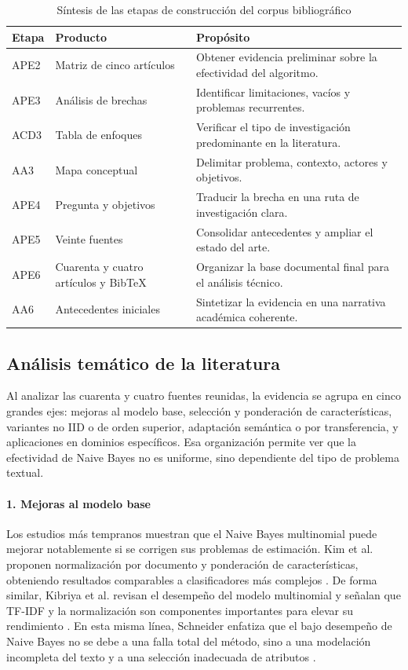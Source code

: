 \begin{table}[htbp]
\centering
\caption{Síntesis de las etapas de construcción del corpus bibliográfico}
\label{tab:etapas}
\begin{tabular}{|p{2.4cm}|p{2.8cm}|p{8.0cm}|}
\hline
\textbf{Etapa} & \textbf{Producto} & \textbf{Propósito} \\
\hline
APE2 & Matriz de cinco artículos & Obtener evidencia preliminar sobre la efectividad del algoritmo. \\
\hline
APE3 & Análisis de brechas & Identificar limitaciones, vacíos y problemas recurrentes. \\
\hline
ACD3 & Tabla de enfoques & Verificar el tipo de investigación predominante en la literatura. \\
\hline
AA3 & Mapa conceptual & Delimitar problema, contexto, actores y objetivos. \\
\hline
APE4 & Pregunta y objetivos & Traducir la brecha en una ruta de investigación clara. \\
\hline
APE5 & Veinte fuentes & Consolidar antecedentes y ampliar el estado del arte. \\
\hline
APE6 & Cuarenta y cuatro artículos y BibTeX & Organizar la base documental final para el análisis técnico. \\
\hline
AA6 & Antecedentes iniciales & Sintetizar la evidencia en una narrativa académica coherente. \\
\hline
\end{tabular}
\end{table}

\subsection{Análisis temático de la literatura}

Al analizar las cuarenta y cuatro fuentes reunidas, la evidencia se agrupa en cinco grandes ejes: mejoras al modelo base, selección y ponderación de características, variantes no IID o de orden superior, adaptación semántica o por transferencia, y aplicaciones en dominios específicos. Esa organización permite ver que la efectividad de Naive Bayes no es uniforme, sino dependiente del tipo de problema textual.

\paragraph{1. Mejoras al modelo base}

Los estudios más tempranos muestran que el Naive Bayes multinomial puede mejorar notablemente si se corrigen sus problemas de estimación. Kim et al. proponen normalización por documento y ponderación de características, obteniendo resultados comparables a clasificadores más complejos \cite{Kim2006}. De forma similar, Kibriya et al. revisan el desempeño del modelo multinomial y señalan que TF-IDF y la normalización son componentes importantes para elevar su rendimiento \cite{Kibriya2005}. En esta misma línea, Schneider enfatiza que el bajo desempeño de Naive Bayes no se debe a una falla total del método, sino a una modelación incompleta del texto y a una selección inadecuada de atributos \cite{10.1007/978-3-540-30586-6_76}.

